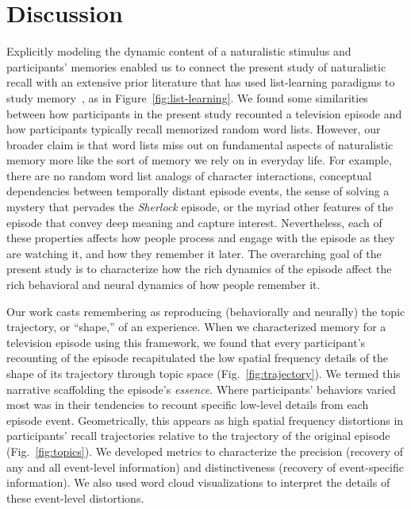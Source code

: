 \documentclass[10pt]{article}
\begin{document}
\section*{Discussion}
\label{sec:discussion}

Explicitly modeling the dynamic content of a naturalistic stimulus and participants' memories enabled us to connect the present study of naturalistic recall with an extensive prior literature that has used list-learning paradigms to study memory~\citep[for review see][]{Kaha12}, as in Figure~\ref{fig:list-learning}.  We found some similarities between how participants in the present study recounted a television episode and how participants typically recall memorized random word lists.  However, our broader claim is that word lists miss out on fundamental aspects of naturalistic memory more like the sort of memory we rely on in everyday life.  For example, there are no random word list analogs of character interactions, conceptual dependencies between temporally distant episode events, the sense of solving a mystery that pervades the \textit{Sherlock} episode, or the myriad other features of the episode that convey deep meaning and capture interest.  Nevertheless, each of these properties affects how people process and engage with the episode as they are watching it, and how they remember it later.  The overarching goal of the present study is to characterize how the rich dynamics of the episode affect the rich behavioral and neural dynamics of how people remember it.

Our work casts remembering as reproducing (behaviorally and neurally) the topic trajectory, or ``shape,'' of an experience.  When we characterized memory for a television episode using this framework, we found that every participant's recounting of the episode recapitulated the low spatial frequency details of the shape of its trajectory through topic space (Fig.~\ref{fig:trajectory}).  We termed this narrative scaffolding the episode's \textit{essence}.  Where participants' behaviors varied most was in their tendencies to recount specific low-level details from each episode event.  Geometrically, this appears as high spatial frequency distortions in participants' recall trajectories relative to the trajectory of the original episode (Fig.~\ref{fig:topics}).  We developed metrics to characterize the precision (recovery of any and all event-level information) and distinctiveness (recovery of event-specific information).  We also used word cloud visualizations to interpret the details of these event-level distortions.
\end{document}
